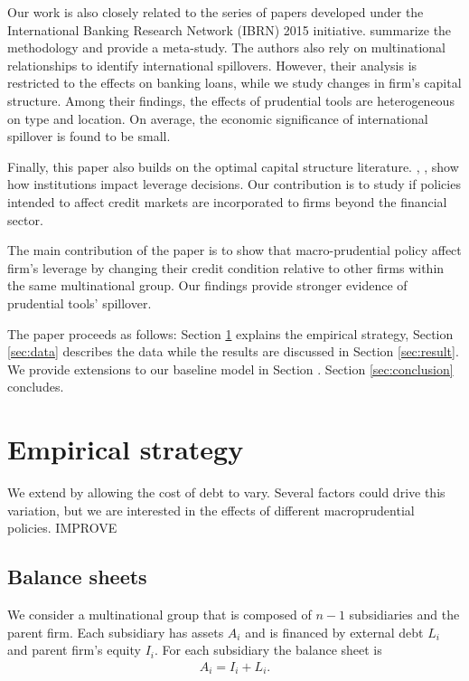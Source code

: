 \documentclass[12pt]{article}
\begin{document}
	Our work is also closely related to the series of papers developed under the International Banking Research Network (IBRN) 2015 initiative. \cite*{buch2017cross} summarize the methodology and provide a meta-study. The authors also rely on multinational relationships to identify international spillovers. However, their analysis is restricted to the effects on banking loans, while we study changes in firm's capital structure. Among their findings, the effects of prudential tools are heterogeneous on type and location. On average, the economic significance of international spillover is found to be small.  
	
	Finally, this paper also builds on the optimal capital structure literature. \cite*{demirgucc1998law}, \cite*{beck2004bank}, show how institutions impact leverage decisions. Our contribution is to study if policies intended to affect credit markets are incorporated to firms beyond the financial sector.   
	
   The main contribution of the paper is to show that macro-prudential policy affect firm's leverage by changing their credit condition relative to other firms within the same multinational group. Our findings provide stronger evidence of prudential tools' spillover.
	
	The paper proceeds as follows: Section \ref{sec:strategy} explains the empirical strategy, Section \ref{sec:data} describes the data while the results are discussed in Section \ref{sec:result}. We provide extensions to our baseline model in Section \label{sec:discussion}. Section \ref{sec:conclusion} concludes. 
	
	\section{Empirical strategy} \label{sec:strategy}
	We extend \cite{huizinga2008capital} by allowing the cost of debt to vary. Several factors could drive this variation, but we are interested in the effects of different macroprudential policies. IMPROVE
	\subsection{Balance sheets}
	 \label{subsec:balancesheet}
	We consider a multinational group that is composed of $n-1$ subsidiaries and the parent firm. Each subsidiary has assets $A_i$ and is financed by external debt $L_i$ and parent firm's equity $I_i$. For each subsidiary the balance sheet is
		\begin{equation}
	\begin{aligned}
	 A_i=I_i+L_i. 
	\end{aligned}
	\label{eq:sub balance sheet}
	\end{equation}
\end{document}
